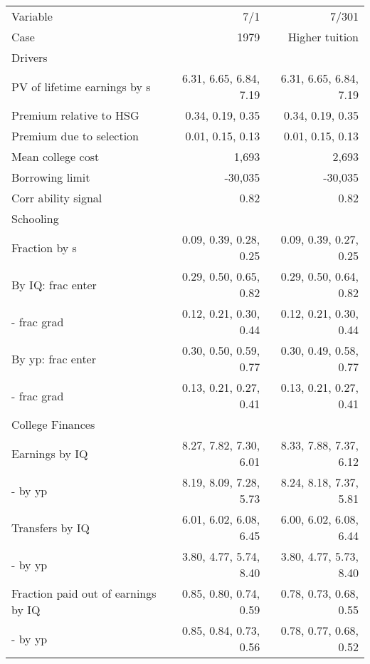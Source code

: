 \begin{tabular}{lrr}
\hline
Variable & 7/1  & 7/301  \\ 
Case & 1979  & Higher tuition  \\ 
Drivers &   &   \\ 
PV of lifetime earnings by s & 6.31, 6.65, 6.84, 7.19  & 6.31, 6.65, 6.84, 7.19  \\ 
Premium relative to HSG & 0.34, 0.19, 0.35  & 0.34, 0.19, 0.35  \\ 
Premium due to selection & 0.01, 0.15, 0.13  & 0.01, 0.15, 0.13  \\ 
Mean college cost & 1,693  & 2,693  \\ 
Borrowing limit & -30,035  & -30,035  \\ 
Corr ability signal & 0.82  & 0.82  \\ 
\hline
Schooling &   &   \\ 
Fraction by s & 0.09, 0.39, 0.28, 0.25  & 0.09, 0.39, 0.27, 0.25  \\ 
By IQ: frac enter & 0.29, 0.50, 0.65, 0.82  & 0.29, 0.50, 0.64, 0.82  \\ 
- frac grad & 0.12, 0.21, 0.30, 0.44  & 0.12, 0.21, 0.30, 0.44  \\ 
By yp: frac enter & 0.30, 0.50, 0.59, 0.77  & 0.30, 0.49, 0.58, 0.77  \\ 
- frac grad & 0.13, 0.21, 0.27, 0.41  & 0.13, 0.21, 0.27, 0.41  \\ 
\hline
College Finances &   &   \\ 
Earnings by IQ & 8.27, 7.82, 7.30, 6.01  & 8.33, 7.88, 7.37, 6.12  \\ 
- by yp & 8.19, 8.09, 7.28, 5.73  & 8.24, 8.18, 7.37, 5.81  \\ 
Transfers by IQ & 6.01, 6.02, 6.08, 6.45  & 6.00, 6.02, 6.08, 6.44  \\ 
- by yp & 3.80, 4.77, 5.74, 8.40  & 3.80, 4.77, 5.73, 8.40  \\ 
Fraction paid out of earnings by IQ & 0.85, 0.80, 0.74, 0.59  & 0.78, 0.73, 0.68, 0.55  \\ 
- by yp & 0.85, 0.84, 0.73, 0.56  & 0.78, 0.77, 0.68, 0.52  \\ 
\hline
\end{tabular}%

